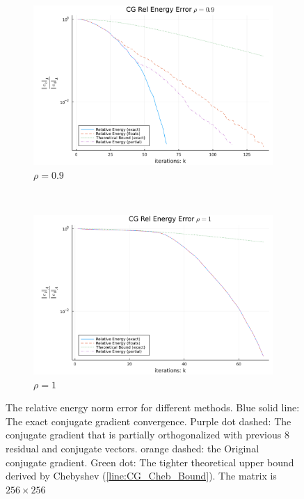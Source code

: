 \documentclass[]{article}
\theoremstyle{definition}
\begin{document}
            \begin{figure}[H]
                \centering
                \begin{subfigure}[H]{14cm}
                    \centering
                    \includegraphics[width=12cm]{cg_convergence_0.9.png}
                    \caption{$\rho = 0.9$}
                    \label{fig:1top}
                \end{subfigure}
                \\[2em]
                \begin{subfigure}[H]{14cm}
                    \centering
                    \includegraphics[width=12cm]{cg_convergence_1.png}
                    \caption{$\rho = 1$}
                    \label{fig:1bottom}
                \end{subfigure}
                \caption{
                    The relative energy norm error for different methods. Blue solid line: The exact conjugate gradient convergence. Purple dot dashed: The conjugate gradient that is partially orthogonalized with previous 8 residual and conjugate vectors. orange dashed: the Original conjugate gradient. Green dot: The tighter theoretical upper bound derived by Chebyshev (\hyperref[line:CG_Cheb_Bound]{\ref*{line:CG_Cheb_Bound}}). The matrix is $256\times 256$
                }
                \label{fig:1}
            \end{figure}
\end{document}
